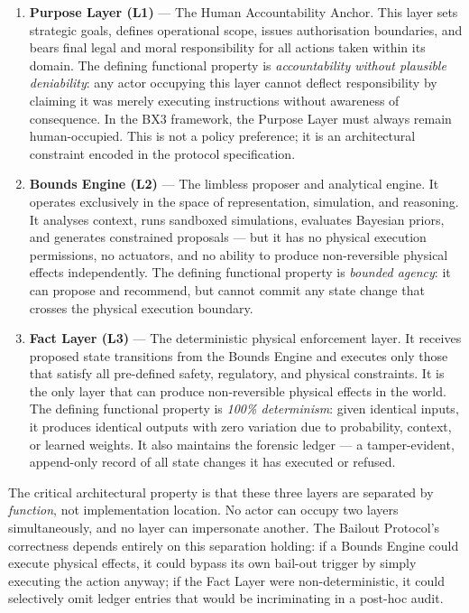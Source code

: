 \begin{enumerate}
\item \textbf{Purpose Layer (L1)} — The Human Accountability Anchor. This layer sets strategic goals, defines operational scope, issues authorisation boundaries, and bears final legal and moral responsibility for all actions taken within its domain. The defining functional property is \textit{accountability without plausible deniability}: any actor occupying this layer cannot deflect responsibility by claiming it was merely executing instructions without awareness of consequence. In the BX3 framework, the Purpose Layer must always remain human-occupied. This is not a policy preference; it is an architectural constraint encoded in the protocol specification.

\item \textbf{Bounds Engine (L2)} — The limbless proposer and analytical engine. It operates exclusively in the space of representation, simulation, and reasoning. It analyses context, runs sandboxed simulations, evaluates Bayesian priors, and generates constrained proposals — but it has no physical execution permissions, no actuators, and no ability to produce non-reversible physical effects independently. The defining functional property is \textit{bounded agency}: it can propose and recommend, but cannot commit any state change that crosses the physical execution boundary.

\item \textbf{Fact Layer (L3)} — The deterministic physical enforcement layer. It receives proposed state transitions from the Bounds Engine and executes only those that satisfy all pre-defined safety, regulatory, and physical constraints. It is the only layer that can produce non-reversible physical effects in the world. The defining functional property is \textit{100\% determinism}: given identical inputs, it produces identical outputs with zero variation due to probability, context, or learned weights. It also maintains the forensic ledger — a tamper-evident, append-only record of all state changes it has executed or refused.
\end{enumerate}

The critical architectural property is that these three layers are separated by \textit{function}, not implementation location. No actor can occupy two layers simultaneously, and no layer can impersonate another. The Bailout Protocol's correctness depends entirely on this separation holding: if a Bounds Engine could execute physical effects, it could bypass its own bail-out trigger by simply executing the action anyway; if the Fact Layer were non-deterministic, it could selectively omit ledger entries that would be incriminating in a post-hoc audit.

